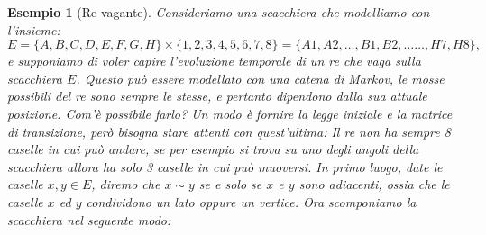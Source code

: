\documentclass[11pt]{book}
\theoremstyle{Definizione}
\theoremstyle{TeoremaProposizioneLemmaCorollario}
\theoremstyle{OsservazioneNota}
\newtheorem{myes}{Esempio}[section]
\renewcommand{\i}{\textup{i}}
\begin{document}
\begin{myes}[Re vagante]
Consideriamo una scacchiera che modelliamo con l'insieme:
$$
E = \{A,B,C,D,E,F,G,H\}\times \{1,2,3,4,5,6,7,8\} = \{A1,A2,\dots,B1,B2,\dots\dots,H7,H8\},
$$
e supponiamo di voler capire l'evoluzione temporale di un re che vaga sulla scacchiera $E$. Questo può essere modellato con una catena di Markov, le mosse possibili del re sono sempre le stesse, e pertanto dipendono dalla sua attuale posizione. Com'è possibile farlo? Un modo è fornire la legge iniziale e la matrice di transizione, però bisogna stare attenti con quest'ultima: Il re non ha sempre 8 caselle in cui può andare, se per esempio si trova su uno degli angoli della scacchiera allora ha solo 3 caselle in cui può muoversi. In primo luogo, date le caselle $x,y\in E$, diremo che $x\sim y$ se e solo se $x$ e $y$ sono adiacenti, ossia che le caselle $x$ ed $y$ condividono un lato oppure un vertice. Ora scomponiamo la scacchiera nel seguente modo:
\begin{center}
\end{center}
\end{myes}
\end{document}
